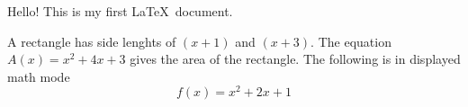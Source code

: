 \documentclass[11pt]{article}
\begin{document}
Hello! This is my first \LaTeX\ document.

A rectangle has side lenghts of $(x + 1)$ and $(x + 3)$.
The equation ${A(x)=x^2+4x+3}$ gives the area of the rectangle.
The following is in displayed math mode $$f(x) = x^2+2x+1$$
\end{document}
